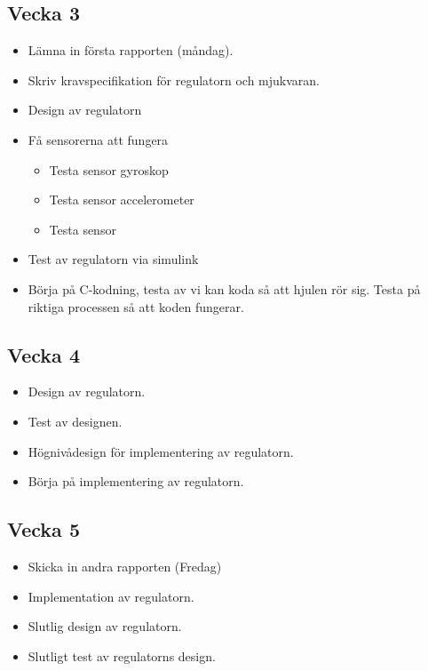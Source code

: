 \documentclass[a4paper]{article}
\begin{document}
	

	
    
    \subsection*{Vecka 3}
    \begin{itemize}
    \item Lämna in första rapporten (måndag).
	\item Skriv kravspecifikation för regulatorn och mjukvaran.
    \item Design av regulatorn
    \item Få sensorerna att fungera
    \begin{itemize}
    	\item Testa sensor gyroskop
	\item Testa sensor accelerometer
	\item Testa sensor 
    \end{itemize}
    \item Test av regulatorn via simulink
    \item Börja på C-kodning, testa av vi kan koda så att hjulen rör sig. Testa på riktiga processen så att koden fungerar.
	\end{itemize}
    
    \subsection*{Vecka 4}
    \begin{itemize}
	\item Design av regulatorn.
    \item Test av designen.
    \item Högnivådesign för implementering av regulatorn.
    \item Börja på implementering av regulatorn.
	\end{itemize}
    
    \subsection*{Vecka 5}
    \begin{itemize}
    \item Skicka in andra rapporten (Fredag)
	\item Implementation av regulatorn.
    \item Slutlig design av regulatorn.
    \item Slutligt test av regulatorns design.
	\end{itemize}
    
\end{document}
